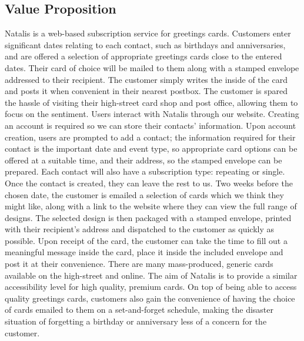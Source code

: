 \subsection*{Value Proposition}
Natalis is a web-based subscription service for greetings cards.
Customers enter significant dates relating to each contact, such as birthdays and anniversaries, and are offered a selection of appropriate greetings cards close to the entered dates. Their card of choice will be mailed to them along with a stamped envelope addressed to their recipient. The customer simply writes the inside of the card and posts it when convenient in their nearest postbox. The customer is spared the hassle of visiting their high-street card shop and post office, allowing them to focus on the sentiment.
Users interact with Natalis through our website. Creating an account is required so we can store their contacts' information. Upon account creation, users are prompted to add a contact; the information required for their contact is the important date and event type, so appropriate card options can be offered at a suitable time, and their address, so the stamped envelope can be prepared. Each contact will also have a subscription type: repeating or single. Once the contact is created, they can leave the rest to us.
Two weeks before the chosen date, the customer is emailed a selection of cards which we think they might like, along with a link to the website where they can view the full range of designs. The selected design is then packaged with a stamped envelope, printed with their recipient's address and dispatched to the customer as quickly as possible. Upon receipt of the card, the customer can take the time to fill out a meaningful message inside the card, place it inside the included envelope and post it at their convenience.
There are many mass-produced, generic cards available on the high-street and online. The aim of Natalis is to provide a similar accessibility level for high quality, premium cards. On top of being able to access quality greetings cards, customers also gain the convenience of having the choice of cards emailed to them on a set-and-forget schedule, making the disaster situation of forgetting a birthday or anniversary less of a concern for the customer.
